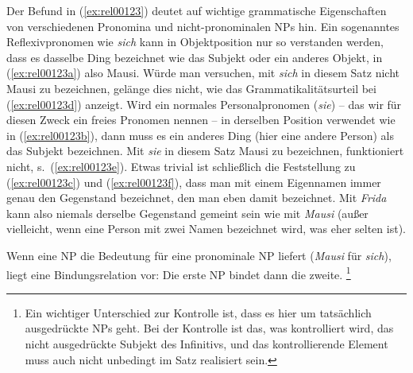 \begin{exe}
  \ex\label{ex:rel00123} 
  \begin{xlist}
  \end{xlist}
\end{exe}

Der Befund in (\ref{ex:rel00123}) deutet auf wichtige grammatische Eigenschaften von verschiedenen Pronomina und nicht-pronominalen NPs hin.
Ein sogenanntes Reflexivpronomen wie \textit{sich} kann in Objektposition nur so verstanden werden, dass es dasselbe Ding bezeichnet wie das Subjekt oder ein anderes Objekt, in (\ref{ex:rel00123a}) also Mausi.
Würde man versuchen, mit \textit{sich} in diesem Satz nicht Mausi zu bezeichnen, gelänge dies nicht, wie das Grammatikalitätsurteil bei (\ref{ex:rel00123d}) anzeigt.
Wird ein normales Personalpronomen (\textit{sie}) -- das wir für diesen Zweck ein freies Pronomen nennen -- in derselben Position verwendet wie in (\ref{ex:rel00123b}), dann muss es ein anderes Ding (hier eine andere Person) als das Subjekt bezeichnen.
Mit \textit{sie} in diesem Satz Mausi zu bezeichnen, funktioniert nicht, s.\ (\ref{ex:rel00123e}).
Etwas trivial ist schließlich die Feststellung zu (\ref{ex:rel00123c}) und (\ref{ex:rel00123f}), dass man \zB mit einem Eigennamen immer genau den Gegenstand bezeichnet, den man eben damit bezeichnet. 
Mit \textit{Frida} kann also niemals derselbe Gegenstand gemeint sein wie mit \textit{Mausi} (außer vielleicht, wenn eine Person mit zwei Namen bezeichnet wird, was eher selten ist).

Wenn eine NP die Bedeutung für eine pronominale NP liefert (\zB \textit{Mausi} für \textit{sich}), liegt eine Bindungsrelation vor:
Die erste NP bindet dann die zweite.%
\footnote{Ein wichtiger Unterschied zur Kontrolle ist, dass es hier um tatsächlich ausgedrückte NPs geht.
Bei der Kontrolle ist das, was kontrolliert wird, das nicht ausgedrückte Subjekt des Infinitivs, und das kontrollierende Element muss auch nicht unbedingt im Satz realisiert sein.}



